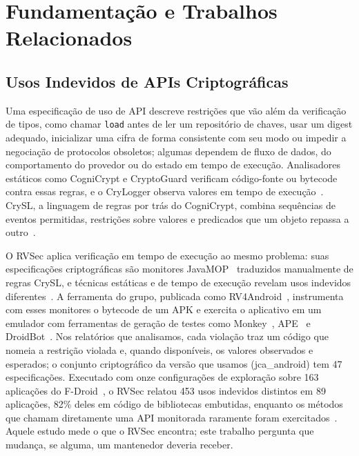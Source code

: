 \documentclass[conference]{IEEEtran}
\begin{document}
\section{Fundamentação e Trabalhos Relacionados}
\label{sec:background}

\subsection{Usos Indevidos de APIs Criptográficas}

Uma especificação de uso de API descreve restrições que vão além da verificação
de tipos, como chamar \texttt{load} antes de ler um repositório de chaves, usar
um digest adequado, inicializar uma cifra de forma consistente com seu modo ou
impedir a negociação de protocolos obsoletos; algumas dependem de fluxo de
dados, do comportamento do provedor ou do estado em tempo de execução.
Analisadores estáticos como CogniCrypt
e CryptoGuard verificam código-fonte ou bytecode contra essas regras, e o
CryLogger observa valores em tempo de
execução~\cite{krueger2017cognicrypt,rahaman2019cryptoguard,piccolboni2021crylogger}.
CrySL, a linguagem de regras por trás do CogniCrypt, combina sequências de
eventos permitidas, restrições sobre valores e predicados que um objeto repassa
a outro~\cite{krueger2021crysl}.

O RVSec aplica verificação em tempo de execução ao mesmo problema: suas
especificações criptográficas são monitores JavaMOP~\cite{jin2012javamop}
traduzidos manualmente de regras CrySL, e técnicas estáticas e de tempo de
execução revelam usos indevidos diferentes~\cite{torres2023runtime}. A
ferramenta do grupo, publicada como RV4Android~\cite{costa2026rv4android},
instrumenta com esses monitores o bytecode de um APK e exercita o aplicativo em
um emulador com ferramentas de geração de testes como
Monkey~\cite{androidmonkey}, APE~\cite{gu2019ape} e
DroidBot~\cite{li2017droidbot}. Nos relatórios que analisamos, cada violação
traz um código que nomeia a restrição violada e, quando disponíveis, os valores
observados e esperados; o conjunto criptográfico da versão que usamos
(jca\_android) tem 47 especificações. Executado com onze configurações de
exploração sobre 163 aplicações do F-Droid~\cite{fdroid}, o RVSec relatou 453 usos indevidos distintos em 89 aplicações, 82\% deles
em código de bibliotecas embutidas, enquanto os métodos que chamam diretamente uma
API monitorada raramente foram exercitados~\cite{costa2026effectiveness}. Aquele
estudo mede o que o RVSec encontra; este trabalho pergunta que mudança, se
alguma, um mantenedor deveria receber.
\end{document}
